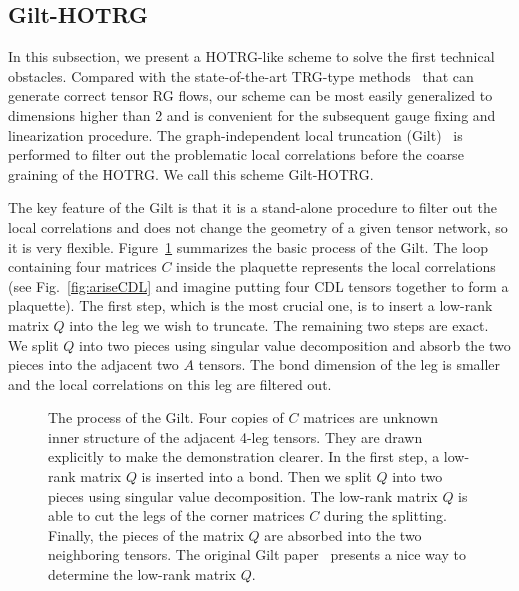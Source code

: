 \documentclass[aps,prb,reprint,superscriptaddress,floatfix]{revtex4-2}
\begin{document}
\subsection{Gilt-HOTRG\label{sec:gilthotrg}}
In this subsection, we present a HOTRG-like scheme to solve the first technical obstacles.
Compared with the state-of-the-art TRG-type methods~\cite{GuWen2009,tnr,tnralgo,tnrplus,looptnr,harada2018,fet,tns,tensor-ring,gilts} that can generate correct tensor RG flows, our scheme can be most easily generalized to dimensions higher than 2 and is convenient for the subsequent gauge fixing and linearization procedure.
The graph-independent local truncation (Gilt)~\cite{gilts} is performed to filter out the problematic local correlations before the coarse graining of the HOTRG\@.
We call this scheme Gilt-HOTRG\@.
%

The key feature of the Gilt is that it is a stand-alone procedure to filter out the local correlations and does not change the geometry of a given tensor network, so it is very flexible.
Figure~\ref{fig:gilt} summarizes the basic process of the Gilt. 
The loop containing four matrices $C$ inside the plaquette represents the local correlations (see Fig.~\ref{fig:ariseCDL} and imagine putting four CDL tensors together to form a plaquette). 
The first step, which is the most crucial one, is to insert a low-rank matrix $Q$ into the leg we wish to truncate. 
The remaining two steps are exact. We split $Q$ into two pieces using singular value decomposition and absorb the two pieces into the adjacent two $A$ tensors. 
The bond dimension of the leg is smaller and the local correlations on this leg are filtered out. 
%
%
\begin{figure}[ht]
    \caption{\label{fig:gilt}
        The process of the Gilt. 
        Four copies of $C$ matrices are unknown inner structure of the adjacent 4-leg tensors.
        They are drawn explicitly to make the demonstration clearer.
        In the first step, a low-rank matrix $Q$ is inserted into a bond. Then we split $Q$ into two pieces using singular value decomposition. 
        The low-rank matrix $Q$ is able to cut the legs of the corner matrices $C$ during the splitting. Finally, the pieces of the matrix $Q$ are absorbed into the two neighboring tensors. 
        The original Gilt paper~\cite{gilts} presents a nice way to determine the
low-rank matrix $Q$.}
\end{figure}
%
\end{document}
